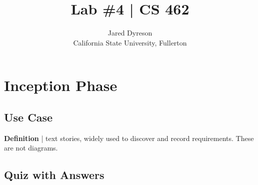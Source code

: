 \documentclass{article}
\title{Lab \#4 | CS 462}
\author{Jared Dyreson\\ 
        California State University, Fullerton}
\begin{document}
\maketitle
\tableofcontents
\newpage

\section{Inception Phase}

\subsection{Use Case}

\textbf{Definition} | text stories, widely used to discover and record requirements. These are not diagrams.


\newpage

\subsection{Quiz with Answers}
\end{document}
